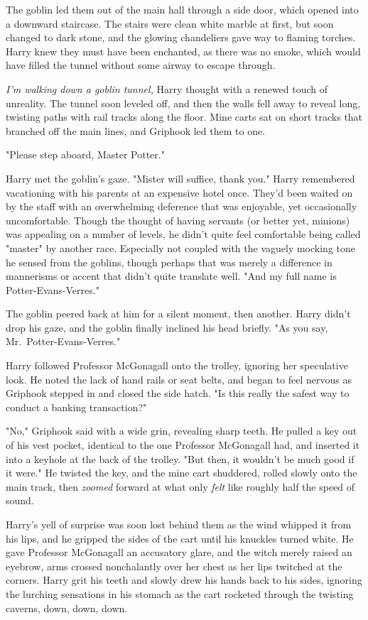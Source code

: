 The goblin led them out of the main hall through a side
door, which opened into a downward staircase. The stairs
were clean white marble at first, but soon changed to dark
stone, and the glowing chandeliers gave way to flaming
torches. Harry knew they must have been enchanted, as
there was no smoke, which would have filled the tunnel
without some airway to escape through.

\emph{I'm walking down a goblin tunnel,} Harry thought with a
renewed touch of unreality. The tunnel soon leveled off,
and then the walls fell away to reveal long, twisting paths
with rail tracks along the floor. Mine carts sat on short
tracks that branched off the main lines, and Griphook led
them to one.

"Please step aboard, Master Potter."

Harry met the goblin's gaze. "Mister will suffice, thank
you." Harry remembered vacationing with his parents at an
expensive hotel once. They'd been waited on by the staff
with an overwhelming deference that was enjoyable, yet
occasionally uncomfortable. Though the thought of
having servants (or better yet, minions) was appealing on
a number of levels, he didn't quite feel comfortable being
called "master" by another race. Especially not coupled with
the vaguely mocking tone he sensed from the goblins,
though perhaps that was merely a difference in
mannerisms or accent that didn't quite translate well. "And
my full name is Potter-Evans-Verres."

The goblin peered back at him for a silent moment, then
another. Harry didn't drop his gaze, and the goblin finally
inclined his head briefly. "As you say, Mr.~Potter-Evans-Verres."

Harry followed Professor McGonagall onto the trolley,
ignoring her speculative look. He noted the lack of hand
rails or seat belts, and began to feel nervous as Griphook
stepped in and closed the side hatch. "Is this really the
safest way to conduct a banking transaction?"

"No," Griphook said with a wide grin, revealing sharp teeth.
He pulled a key out of his vest pocket, identical to the
one Professor McGonagall had, and inserted it into a
keyhole at the back of the trolley. "But then, it wouldn't
be much good if it were." He twisted the key, and the
mine cart shuddered, rolled slowly onto the main track,
then \emph{zoomed} forward at what only \emph{felt} like roughly half
the speed of sound.

Harry's yell of surprise was soon lost behind them as the
wind whipped it from his lips, and he gripped the sides of
the cart until his knuckles turned white. He gave Professor
McGonagall an accusatory glare, and the witch merely
raised an eyebrow, arms crossed nonchalantly over her
chest as her lips twitched at the corners. Harry grit his
teeth and slowly drew his hands back to his sides, ignoring
the lurching sensations in his stomach as the cart rocketed
through the twisting caverns, down, down, down.

